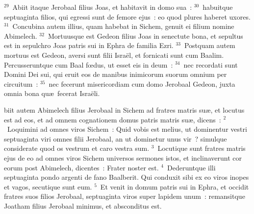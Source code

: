 ${}^{29}$~Abiit itaque Jerobaal filius Joas, et habitavit in domo sua~:
${}^{30}$~habuitque septuaginta filios, qui egressi sunt de femore ejus~: eo quod plures haberet uxores.
${}^{31}$~Concubina autem illius, quam habebat in Sichem, genuit ei filium nomine Abimelech.
${}^{32}$~Mortuusque est Gedeon filius Joas in senectute bona, et sepultus est in sepulchro Joas patris sui in Ephra de familia Ezri.
${}^{33}$~Postquam autem mortuus est Gedeon, aversi sunt filii Isra\"el, et fornicati sunt cum Baalim. Percusseruntque cum Baal fœdus, ut esset eis in deum~:
${}^{34}$~nec recordati sunt Domini Dei sui, qui eruit eos de manibus inimicorum suorum omnium per circuitum~:
${}^{35}$~nec fecerunt misericordiam cum domo Jerobaal Gedeon, juxta omnia bona qu\ae\ fecerat Isra\"eli.

\bchapter
{}biit autem Abimelech filius Jerobaal in Sichem ad fratres matris su\ae , et locutus est ad eos, et ad omnem cognationem domus patris matris su\ae , dicens~:
${}^{2}$~Loquimini ad omnes viros Sichem~: Quid vobis est melius, ut dominentur vestri septuaginta viri omnes filii Jerobaal, an ut dominetur unus vir~? simulque considerate quod os vestrum et caro vestra sum.
${}^{3}$~Locutique sunt fratres matris ejus de eo ad omnes viros Sichem universos sermones istos, et inclinaverunt cor eorum post Abimelech, dicentes~: Frater noster est.
${}^{4}$~Dederuntque illi septuaginta pondo argenti de fano Baalberit. Qui conduxit sibi ex eo viros inopes et vagos, secutique sunt eum.
${}^{5}$~Et venit in domum patris sui in Ephra, et occidit fratres suos filios Jerobaal, septuaginta viros super lapidem unum~: remansitque Joatham filius Jerobaal minimus, et absconditus est.


